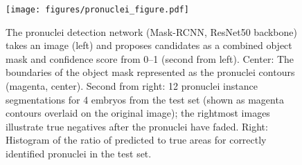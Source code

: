 
\begin{figure}
\texttt{[image: figures/pronuclei\_figure.pdf]}
\caption{
    The pronuclei detection network (Mask-RCNN, ResNet50 backbone) takes an
    image (left) and proposes candidates as a combined object mask and
    confidence score from 0--1 (second from left). Center: The boundaries of
    the object mask represented as the pronuclei contours (magenta, center).
    Second from right: 12 pronuclei instance segmentations for 4 embryos from
    the test set (shown as magenta contours overlaid on the original
    image); the rightmost images illustrate true negatives after the
    pronuclei have faded. Right: Histogram of the ratio of predicted to
    true areas for correctly identified pronuclei in the test set.
}
\label{fig:pronuclei}
\end{figure}

